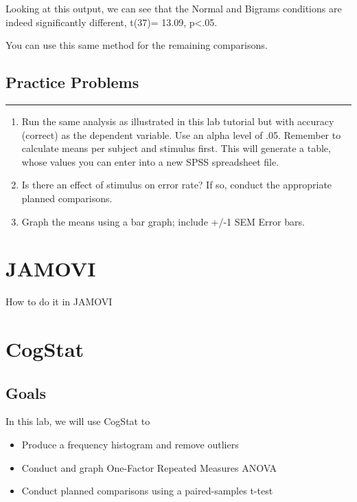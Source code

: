 \documentclass[
]{book}
\begin{document}
Looking at this output, we can see that the Normal and Bigrams conditions are indeed significantly different, t(37)= 13.09, p\textless.05.

You can use this same method for the remaining comparisons.

\hypertarget{practice-problems-8}{%
\subsection{Practice Problems}\label{practice-problems-8}}

\begin{center}\rule{0.5\linewidth}{0.5pt}\end{center}

\begin{enumerate}
\def\labelenumi{\arabic{enumi}.}
\item
  Run the same analysis as illustrated in this lab tutorial but with accuracy (correct) as the dependent variable. Use an alpha level of .05. Remember to calculate means per subject and stimulus first. This will generate a table, whose values you can enter into a new SPSS spreadsheet file.
\item
  Is there an effect of stimulus on error rate? If so, conduct the appropriate planned comparisons.
\item
  Graph the means using a bar graph; include +/-1 SEM Error bars.
\end{enumerate}

\hypertarget{jamovi-9}{%
\section{JAMOVI}\label{jamovi-9}}

How to do it in JAMOVI

\hypertarget{cogstat-10}{%
\section{CogStat}\label{cogstat-10}}

\hypertarget{goals-8}{%
\subsection{Goals}\label{goals-8}}

In this lab, we will use CogStat to

\begin{itemize}
\item
  Produce a frequency histogram and remove outliers
\item
  Conduct and graph One-Factor Repeated Measures ANOVA
\item
  Conduct planned comparisons using a paired-samples t-test
\end{itemize}
\end{document}
